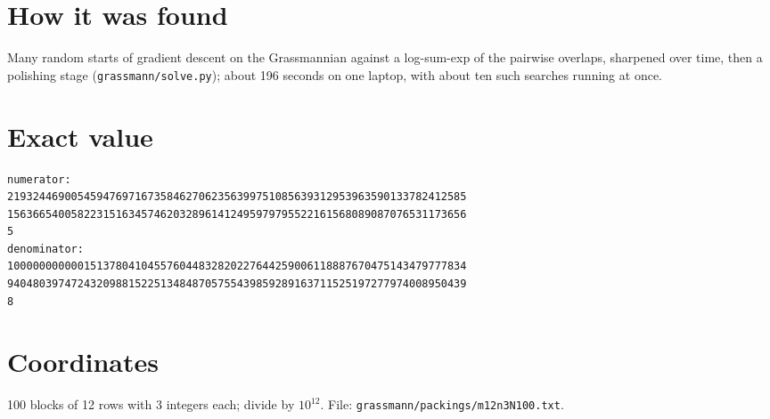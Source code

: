 \documentclass[11pt,a4paper]{article}
\begin{document}
\section{How it was found}
Many random starts of gradient descent on the Grassmannian against a log-sum-exp of the pairwise overlaps, sharpened over time, then a polishing stage (\texttt{grassmann/solve.py}); about 196 seconds on one laptop, with about ten such searches running at once.


\appendix
\section{Exact value}
{\small
\begin{verbatim}
numerator:
219324469005459476971673584627062356399751085639312953963590133782412585
156366540058223151634574620328961412495979795522161568089087076531173656
5
denominator:
100000000000151378041045576044832820227644259006118887670475143479777834
940480397472432098815225134848705755439859289163711525197277974008950439
8
\end{verbatim}}

\section{Coordinates}
100 blocks of 12 rows with 3 integers each; divide by $10^{12}$. File: \texttt{grassmann/packings/m12n3N100.txt}.
{\tiny
\begin{multicols}{3}
\end{multicols}}
\end{document}
